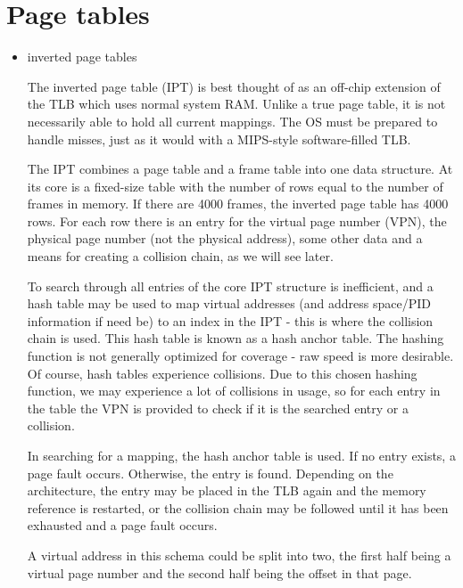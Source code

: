 \documentclass{article}
\begin{document}
\section{Page tables}
\begin{itemize}
\item inverted page tables

The inverted page table (IPT) is best thought of as an off-chip extension of the TLB which uses normal system RAM. Unlike a true page table, it is not necessarily able to hold all current mappings. The OS must be prepared to handle misses, just as it would with a MIPS-style software-filled TLB.

The IPT combines a page table and a frame table into one data structure. At its core is a fixed-size table with the number of rows equal to the number of frames in memory. If there are 4000 frames, the inverted page table has 4000 rows. For each row there is an entry for the virtual page number (VPN), the physical page number (not the physical address), some other data and a means for creating a collision chain, as we will see later.

To search through all entries of the core IPT structure is inefficient, and a hash table may be used to map virtual addresses (and address space/PID information if need be) to an index in the IPT - this is where the collision chain is used. This hash table is known as a hash anchor table. The hashing function is not generally optimized for coverage - raw speed is more desirable. Of course, hash tables experience collisions. Due to this chosen hashing function, we may experience a lot of collisions in usage, so for each entry in the table the VPN is provided to check if it is the searched entry or a collision.

In searching for a mapping, the hash anchor table is used. If no entry exists, a page fault occurs. Otherwise, the entry is found. Depending on the architecture, the entry may be placed in the TLB again and the memory reference is restarted, or the collision chain may be followed until it has been exhausted and a page fault occurs.

A virtual address in this schema could be split into two, the first half being a virtual page number and the second half being the offset in that page.


\end{itemize}
\end{document}
